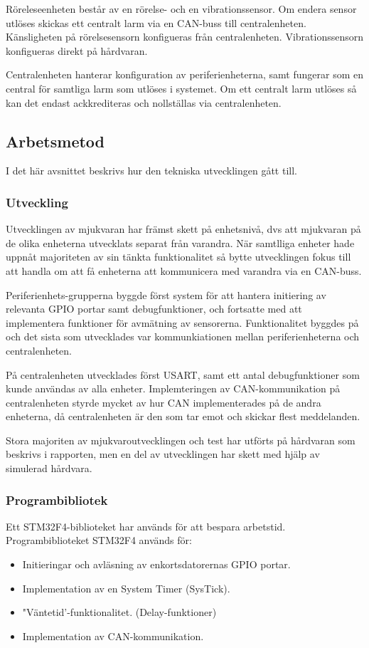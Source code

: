 \documentclass{article}
\begin{document}
Röreleseenheten består av en rörelse- och en vibrationssensor. Om endera sensor
utlöses skickas ett centralt larm via en CAN-buss till centralenheten. Känsligheten
på rörelsesensorn konfigueras från centralenheten. Vibrationssensorn konfigueras direkt på hårdvaran.

Centralenheten hanterar konfiguration av periferienheterna, samt fungerar som en
central för samtliga larm som utlöses i systemet. Om ett centralt larm utlöses så
kan det endast ackkrediteras och nollställas via centralenheten.
\subsection{Arbetsmetod} %

I det här avsnittet beskrivs hur den tekniska utvecklingen gått till.


\subsubsection{Utveckling}

Utvecklingen av mjukvaran har främst skett på enhetsnivå, dvs att mjukvaran på de olika enheterna utvecklats separat från varandra.
När samtlliga enheter hade uppnåt majoriteten av sin tänkta funktionalitet så bytte utvecklingen fokus till att handla om att få enheterna att kommunicera med varandra via en CAN-buss.

Periferienhets-grupperna byggde först system för att hantera initiering av relevanta GPIO portar samt debugfunktioner, och fortsatte med att implementera funktioner för avmätning av sensorerna. Funktionalitet byggdes på och det sista som utvecklades var kommunkiationen mellan periferienheterna och centralenheten.

På centralenheten utvecklades först USART, samt ett antal debugfunktioner som kunde användas av alla enheter. Implemteringen av CAN-kommunikation på centralenheten styrde mycket av hur CAN implementerades på de andra enheterna, då centralenheten är den som tar emot och skickar flest meddelanden.

Stora majoriten av mjukvaroutvecklingen och test har utförts på hårdvaran som beskrivs i rapporten, men en del av utvecklingen har skett med hjälp av simulerad hårdvara.

\subsubsection{Programbibliotek}
\label{stm}
Ett STM32F4-biblioteket har används för att bespara arbetstid.
Programbiblioteket STM32F4\cite{stm} används för:
\begin{itemize}
    \item Initieringar och avläsning av enkortsdatorernas GPIO portar.
    \item Implementation av en System Timer (SysTick).
    \item "Väntetid'-funktionalitet. (Delay-funktioner)
    \item Implementation av CAN-kommunikation.
\end{itemize}
\end{document}
